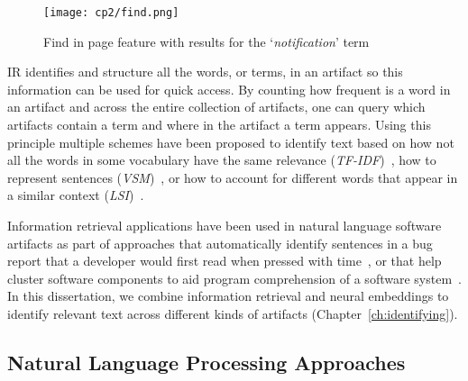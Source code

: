 
\medskip
\begin{figure}[h!]
    \centering
    \texttt{[image: cp2/find.png]}
    \caption{Find in page feature with results for the `\textit{notification}' term}
    \label{fig:find-in-page}
\end{figure}





\acs{IR} identifies and structure all the words, or terms, 
in an artifact so this information can be used for quick access. 
By counting how frequent is a word in 
an artifact and across the entire collection of artifacts, 
one can query which artifacts contain a term and where in the artifact a term appears. 
Using this principle multiple schemes have been proposed 
to identify text based on 
how not all the words in some vocabulary have the same relevance (\textit{TF-IDF})~\cite{luhn1957tf, jones2004idf}, 
how to  represent sentences (\textit{VSM})~\cite{salton1975vector}, 
or how to account for different words that appear in a similar context (\textit{LSI})~\cite{dumais1994latent}.





Information retrieval applications have been used in natural language software artifacts 
as part of approaches that
automatically identify sentences in a bug report that a developer would first read when pressed with time~\cite{Lotufo2012},
or that help cluster software components to aid program comprehension of a software system~\cite{Marcus2003}.
In this dissertation, we combine information retrieval and neural embeddings 
to identify relevant text across different kinds of artifacts (Chapter~\ref{ch:identifying}).



\subsection{Natural Language Processing Approaches}

